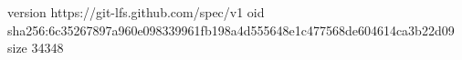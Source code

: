 version https://git-lfs.github.com/spec/v1
oid sha256:6c35267897a960e098339961fb198a4d555648e1c477568de604614ca3b22d09
size 34348
